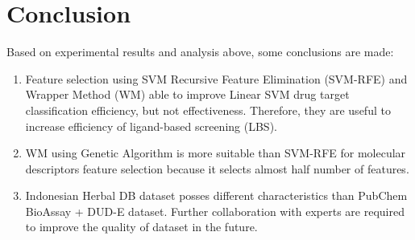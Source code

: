 \documentclass[conference,compsoc,12pt]{IEEEtran}
\begin{document}
	\section{Conclusion}
	
	Based on experimental results and analysis above, some conclusions are made:
	
	\begin{enumerate}
		\item Feature selection using SVM Recursive Feature Elimination (SVM-RFE) and Wrapper Method (WM) able to improve Linear SVM drug target classification efficiency, but not effectiveness. Therefore, they are useful to increase efficiency of ligand-based screening (LBS).
		\item WM using Genetic Algorithm is more suitable than SVM-RFE for molecular descriptors feature selection because it selects almost half number of features.
		\item Indonesian Herbal DB dataset posses different characteristics than PubChem BioAssay + DUD-E dataset. Further collaboration with experts are required to improve the quality of dataset in the future.
	\end{enumerate}
	
	
	
	
	
	
\end{document}
